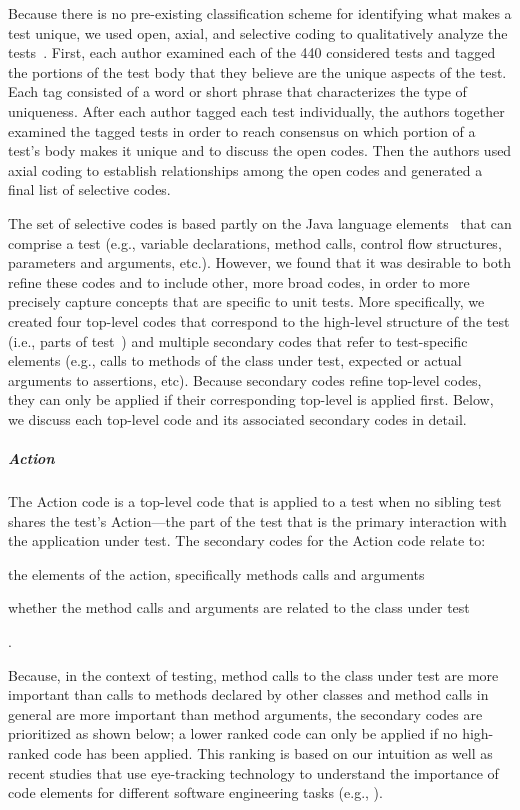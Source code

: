 Because there is no pre-existing classification scheme for identifying what makes a test unique, we used open, axial, and selective coding to qualitatively analyze the tests~\cite{glaser1967discovery, strauss1998basics}.
%
First, each author examined each of the \num{440} considered tests and tagged the portions of the test body that they believe are the unique aspects of the test.
%
Each tag consisted of a word or short phrase that characterizes the type of uniqueness.
%
After each author tagged each test individually, the authors together examined the tagged tests in order to reach consensus on which portion of a test's body makes it unique and to discuss the open codes.
%
Then the authors used axial coding to establish relationships among the open codes and generated a final list of selective codes.

The set of selective codes is based partly on the Java language elements~\cite{Oracle-Classes} that can comprise a test (e.g., variable declarations, method calls, control flow structures, parameters and arguments, etc.).
%
However, we found that it was desirable to both refine these codes and to include other, more broad codes, in order to more precisely capture concepts that are specific to unit tests.
%
More specifically, we created four top-level codes that correspond to the high-level structure of the test (i.e., parts of test~\cite{zhang2016towards}) and multiple secondary codes that refer to test-specific elements (e.g., calls to methods of the class under test, expected or actual arguments to assertions, etc).
%
Because secondary codes refine top-level codes, they can only be applied if their corresponding top-level is applied first. 
%
Below, we discuss each top-level code and its associated secondary codes in detail.

\subparagraph{Action}

The Action code is a top-level code that is applied to a test when no sibling test shares the test's Action---the part of the test that is the primary interaction with the application under test.
%
The secondary codes for the Action code relate to:
\begin{enumerate*}
\item the elements of the action, specifically methods calls and arguments
\item whether the method calls and arguments are related to the class under test
\end{enumerate*}.

Because, in the context of testing, method calls to the class under test are more important than calls to methods declared by other classes and method calls in general are more important than method arguments, the secondary codes are prioritized as shown below; a lower ranked code can only be applied if no high-ranked code has been applied.
%
This ranking is based on our intuition as well as recent studies that use eye-tracking technology to understand the importance of code elements for different software engineering tasks (e.g., \cite{rodeghero2015empirical, rodeghero2015eye, begel2018eye}).

